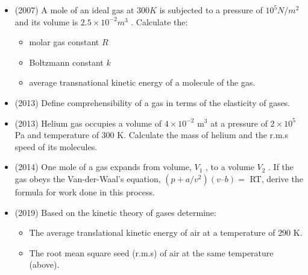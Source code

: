 \documentclass{article}
\begin{document}
\begin{itemize}
\item (2007)  A mole of an ideal gas at $ 300K$ is subjected to a pressure of $ 10^{5}N/m^{2}$ and its volume is $ 2.5 \times 10^{-2}m^{3}$ .  Calculate the:
 \begin{itemize}
\item molar gas constant $ R$
\item Boltzmann constant $ k$
\item average transnational kinetic energy of a molecule of the gas.
\end{itemize}
\item (2013)  Define comprehensibility of a gas in terms of the elasticity of gases. 
\item (2013)  Helium gas occupies a volume of $ 4 \times 10^{-2}$ m$ ^{3}$ at a pressure of $ 2 \times 10^{5}$ Pa and temperature of $ 300$ K. Calculate the mass of helium and the r.m.s speed of its molecules.
\item (2014)  One mole of a gas expands from volume, $ V_{1}$ , to a volume $ V_{2}$ . If the gas obeys the Van-der-Waal’s equation, $ (p+ a/v^{2})(v – b)=$ RT, derive the formula for work done in this process.
\item (2019)  Based on the kinetic theory of gases determine:
 \begin{itemize}
\item The average translational kinetic energy of air at a temperature of $ 290$ K.
\item The root mean square seed (r.m.s) of air at the same temperature (above).
\end{itemize}
\end{itemize}
\end{document}
